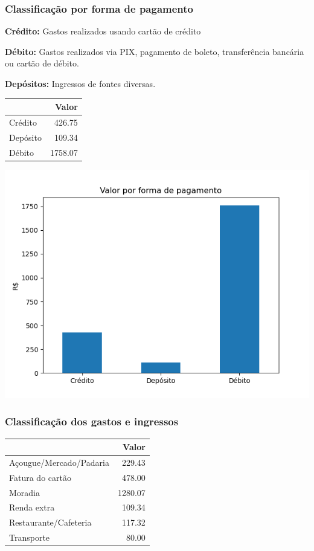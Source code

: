 \documentclass[11pt]{article}
\begin{document}
\subsubsection{Classificação por forma de pagamento}
\label{sec:org7f37fd5}

\textbf{Crédito:} Gastos realizados usando cartão de crédito

\textbf{Débito:} Gastos realizados via PIX, pagamento de boleto, transferência bancária ou cartão de débito.

\textbf{Depósitos:} Ingressos de fontes diversas.

\begin{center}
\begin{tabular}{lr}
 & Valor\\
\hline
Crédito & 426.75\\
Depósito & 109.34\\
Débito & 1758.07\\
\end{tabular}
\end{center}

\begin{center}
\includegraphics[width=.9\linewidth]{outubro-forma.png}
\end{center}

\subsubsection{Classificação dos gastos e ingressos}
\label{sec:orga9ab4b4}

\begin{center}
\begin{tabular}{lr}
 & Valor\\
\hline
Açougue/Mercado/Padaria & 229.43\\
Fatura do cartão & 478.00\\
Moradia & 1280.07\\
Renda extra & 109.34\\
Restaurante/Cafeteria & 117.32\\
Transporte & 80.00\\
\end{tabular}
\end{center}
\end{document}
